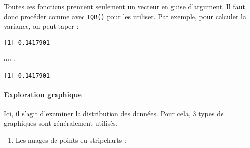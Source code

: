 \documentclass[a4paperpaper,]{article}
\newenvironment{Shaded}{\begin{snugshade}}{\end{snugshade}}
\newcommand{\DataTypeTok}[1]{\textcolor[rgb]{0.00,0.34,0.68}{#1}}
\newcommand{\DecValTok}[1]{\textcolor[rgb]{0.69,0.50,0.00}{#1}}
\newcommand{\KeywordTok}[1]{\textcolor[rgb]{0.12,0.11,0.11}{\textbf{#1}}}
\newcommand{\NormalTok}[1]{\textcolor[rgb]{0.12,0.11,0.11}{#1}}
\newcommand{\OperatorTok}[1]{\textcolor[rgb]{0.12,0.11,0.11}{#1}}
\newcommand{\StringTok}[1]{\textcolor[rgb]{0.75,0.01,0.01}{#1}}
\providecommand{\tightlist}{%
  \setlength{\itemsep}{0pt}\setlength{\parskip}{0pt}}
\let\oldparagraph\paragraph
\renewcommand{\paragraph}[1]{\oldparagraph{#1}\mbox{}}
\begin{document}
Toutes ces fonctions prennent seulement un vecteur en guise d'argument. Il faut donc procéder comme avec \texttt{IQR()} pour les utiliser. Par exemple, pour calculer la variance, on peut taper :

\begin{Shaded}
\end{Shaded}

\begin{verbatim}
[1] 0.1417901
\end{verbatim}

ou :

\begin{Shaded}
\end{Shaded}

\begin{verbatim}
[1] 0.1417901
\end{verbatim}

\hypertarget{exploration-graphique}{%
\paragraph{Exploration graphique}\label{exploration-graphique}}

Ici, il s'agit d'examiner la distribution des données. Pour cela, 3 types de graphiques sont généralement utilisés.

\begin{enumerate}
\def\labelenumi{\arabic{enumi}.}
\tightlist
\item
  Les nuages de points ou stripcharts :
\end{enumerate}

\begin{Shaded}
\end{Shaded}
\end{document}
